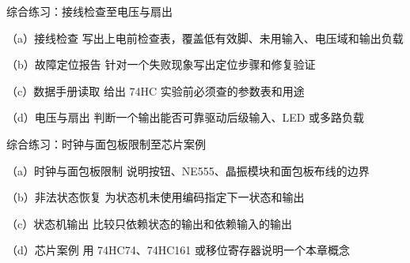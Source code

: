 \begin{chapterexercise}{综合练习：接线检查至电压与扇出}
\begin{exercisesubproblem}{（a）接线检查}
写出上电前检查表，覆盖低有效脚、未用输入、电压域和输出负载
\end{exercisesubproblem}
\begin{exercisesubproblem}{（b）故障定位报告}
针对一个失败现象写出定位步骤和修复验证
\end{exercisesubproblem}
\begin{exercisesubproblem}{（c）数据手册读取}
给出 74HC 实验前必须查的参数表和用途
\end{exercisesubproblem}
\begin{exercisesubproblem}{（d）电压与扇出}
判断一个输出能否可靠驱动后级输入、LED 或多路负载
\end{exercisesubproblem}
\end{chapterexercise}

\begin{chapterexercise}{综合练习：时钟与面包板限制至芯片案例}
\begin{exercisesubproblem}{（a）时钟与面包板限制}
说明按钮、NE555、晶振模块和面包板布线的边界
\end{exercisesubproblem}
\begin{exercisesubproblem}{（b）非法状态恢复}
为状态机未使用编码指定下一状态和输出
\end{exercisesubproblem}
\begin{exercisesubproblem}{（c）状态机输出}
比较只依赖状态的输出和依赖输入的输出
\end{exercisesubproblem}
\begin{exercisesubproblem}{（d）芯片案例}
用 74HC74、74HC161 或移位寄存器说明一个本章概念
\end{exercisesubproblem}
\end{chapterexercise}

